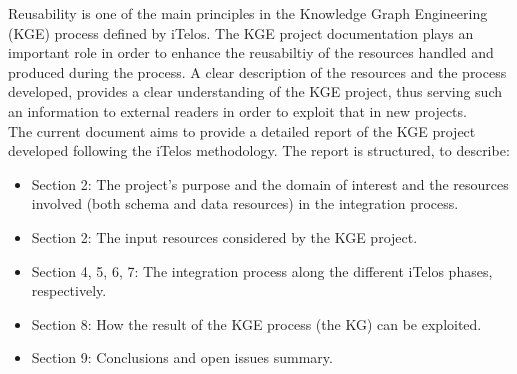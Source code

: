 

Reusability is one of the main principles in the Knowledge Graph Engineering (KGE) process defined by iTelos. The KGE project documentation plays an important role in order to enhance the reusabiltiy of the resources handled and produced during the process. A clear description of the resources and the process developed, provides a clear understanding of the KGE project, thus serving such an information to external readers in order to exploit that in new projects.\\

The current document aims to provide a detailed report of the KGE project developed following the iTelos methodology. The report is structured, to describe:
\begin{itemize}
    \item Section 2: The project's purpose and the domain of interest and the resources involved (both schema and data resources) in the integration process.

    \item Section 2: The input resources considered by the KGE project. 
    
    \item Section 4, 5, 6, 7: The integration process along the different iTelos phases, respectively.
    
    \item Section 8: How the result of the KGE process (the KG) can be exploited.

    \item Section 9: Conclusions and open issues summary.
\end{itemize}